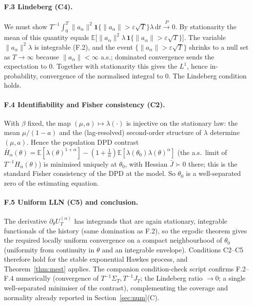 \documentclass[11pt]{article}
\newcommand{\dd}{\,\mathrm{d}}
\newcommand{\E}{\mathbb{E}}
\newcommand{\toP}{\xrightarrow{P}}
\begin{document}
\paragraph{F.3 Lindeberg (C4).}
We must show $T^{-1}\int_0^T\|a_\alpha\|^2\mathbf 1\{\|a_\alpha\|>\varepsilon\sqrt T\}\lambda\dd t\toP0$.
By stationarity the mean of this quantity equals
$\E\big[\|a_\alpha\|^2\lambda\,\mathbf 1\{\|a_\alpha\|>\varepsilon\sqrt T\}\big]$.
The variable $\|a_\alpha\|^2\lambda$ is integrable (F.2), and the event
$\{\|a_\alpha\|>\varepsilon\sqrt T\}$ shrinks to a null set as $T\to\infty$ because
$\|a_\alpha\|<\infty$ a.s.; dominated convergence sends the expectation to $0$.
Together with stationarity this gives the $L^1$, hence in-probability, convergence
of the normalised integral to $0$. The Lindeberg condition holds.

\paragraph{F.4 Identifiability and Fisher consistency (C2).}
With $\beta$ fixed, the map $(\mu,a)\mapsto\lambda(\cdot)$ is injective on the
stationary law: the mean $\mu/(1-a)$ and the (lag-resolved) second-order structure
of $\lambda$ determine $(\mu,a)$. Hence the population DPD contrast
$\bar H_\alpha(\theta)=\E[\lambda(\theta)^{1+\alpha}]-(1+\tfrac1\alpha)\E[\lambda(\theta_0)\lambda(\theta)^{\alpha}]$
(the a.s.\ limit of $T^{-1}H_\alpha(\theta)$) is minimised uniquely at $\theta_0$,
with Hessian $\bar J\succ0$ there; this is the standard Fisher consistency of the
DPD at the model. So $\theta_0$ is a well-separated zero of the estimating equation.

\paragraph{F.5 Uniform LLN (C5) and conclusion.}
The derivative $\partial_\theta U_T^{(\alpha)}$ has integrands that are again
stationary, integrable functionals of the history (same domination as F.2), so the
ergodic theorem gives the required locally uniform convergence on a compact
neighbourhood of $\theta_0$ (uniformity from continuity in $\theta$ and an
integrable envelope). Conditions C2--C5 therefore hold for the stable exponential
Hawkes process, and Theorem~\ref{thm:mest} applies. The companion condition-check
script confirms F.2--F.4 numerically (convergence of $T^{-1}\Sigma_T,T^{-1}J_T$;
the Lindeberg ratio $\to0$; a single well-separated minimiser of the contrast),
complementing the coverage and normality already reported in Section~\ref{sec:num}(C).
\end{document}
